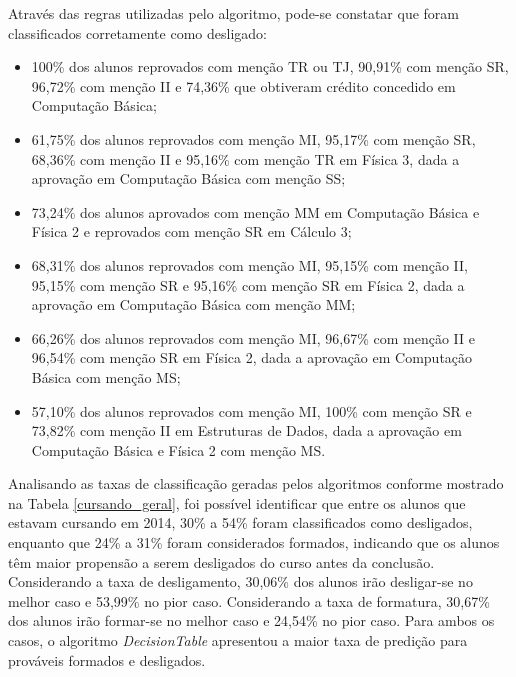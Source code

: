 Através das regras utilizadas pelo algoritmo, pode-se constatar que foram classificados corretamente como desligado:

\begin{itemize}
	\item 100\% dos alunos reprovados com menção TR ou TJ, 90,91\% com menção SR, 96,72\% com menção II e 74,36\% que obtiveram crédito concedido em Computação Básica;
	\item 61,75\% dos alunos reprovados com menção MI, 95,17\% com menção SR, 68,36\% com menção II e 95,16\% com menção TR em Física 3, dada a aprovação em Computação Básica com menção SS;
	\item 73,24\% dos alunos aprovados com menção MM em Computação Básica e Física 2 e reprovados com menção SR em Cálculo 3;
	\item  68,31\% dos alunos reprovados com menção MI, 95,15\% com menção II, 95,15\% com menção SR e 95,16\% com menção SR em Física 2, dada a aprovação em Computação Básica com menção MM;
	\item 66,26\% dos alunos reprovados com menção MI, 96,67\% com menção II e 96,54\% com menção SR em Física 2, dada a aprovação em Computação Básica com menção MS;
	\item 57,10\% dos alunos reprovados com menção MI, 100\% com menção SR e 73,82\% com menção II em Estruturas de Dados, dada a aprovação em Computação Básica e Física 2 com menção MS.
\end{itemize}

Analisando as taxas de classificação geradas pelos algoritmos conforme mostrado na Tabela \ref{cursando_geral}, foi possível identificar que entre os alunos que estavam cursando em 2014, 30\% a 54\% foram classificados como desligados, enquanto que 24\% a 31\% foram considerados formados, indicando que os alunos têm maior propensão a serem desligados do curso antes da conclusão. Considerando a taxa de desligamento, 30,06\% dos alunos irão desligar-se no melhor caso e 53,99\% no pior caso. Considerando a taxa de formatura, 30,67\% dos alunos irão formar-se no melhor caso e 24,54\% no pior caso. Para ambos os casos, o algoritmo \textit{DecisionTable} apresentou a maior taxa de predição para prováveis formados e desligados.

